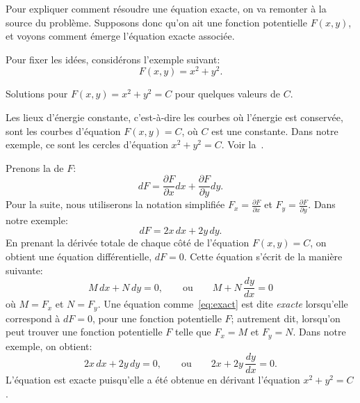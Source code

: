Pour expliquer comment résoudre une équation exacte, on va remonter à la source du problème.
Supposons donc qu'on ait une fonction potentielle $F(x,y)$, et voyons comment émerge l'équation exacte associée.

Pour fixer les idées, considérons l'exemple suivant:
\begin{equation*}
	F(x,y) = x^2+y^2 .
\end{equation*}

\begin{mywrapfig}[17]{3.25in}
	\capstart {}
	\caption{Solutions pour $F(x,y) = x^2+y^2 = C$ pour quelques valeurs de $C$.\label{exact:circlesfig}}
\end{mywrapfig}
Les lieux d'énergie constante, c'est-à-dire les courbes où l'énergie est conservée, sont les courbes d'équation $F(x,y) = C$,
où $C$ est une constante.  Dans notre exemple, ce sont les cercles d'équation $x^2+y^2=C$.
Voir  la~.

Prenons la \emph{} de $F$:
\begin{equation*}
	dF = \frac{\partial F}{\partial x} dx + \frac{\partial F}{\partial y} dy .
\end{equation*}
Pour la suite, nous utiliserons la notation simplifiée
	$F_x = \frac{\partial F}{\partial x}$ et
	$F_y = \frac{\partial F}{\partial y}$.
Dans notre exemple:
\begin{equation*}
	dF = 2x \, dx + 2y \, dy .
\end{equation*}
En prenant la dérivée totale de chaque côté de l'équation $F(x,y) = C$, on obtient une équation différentielle,  $dF = 0$.
Cette équation s'écrit de la manière suivante:
\begin{equation}\label{eq:exact}
	M \, dx + N \, dy = 0, \qquad \text{ou} \qquad	M + N \, \frac{dy}{dx} = 0
\end{equation}
où $M=F_x$ et $N=F_y$.  Une équation comme~\eqref{eq:exact} est dite \emph{exacte} lorsqu'elle correspond à $dF = 0$,
pour une fonction potentielle $F$; autrement dit, lorsqu'on peut trouver une fonction potentielle $F$ telle que $F_x=M$ et $F_y=N$.
Dans notre exemple, on obtient:
\begin{equation*}
	2x \, dx + 2y \, dy = 0, \qquad 	\text{ou} \qquad  2x + 2y \, \frac{dy}{dx} = 0 .
\end{equation*}
L'équation est exacte puisqu'elle a été obtenue en dérivant l'équation $x^2+y^2=C$.

